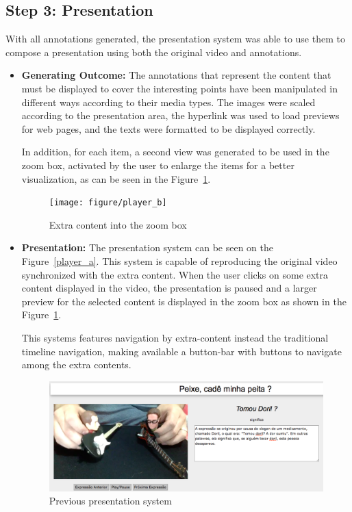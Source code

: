 \subsection{Step 3: Presentation}
With all annotations generated, the presentation system was able to use them to compose a presentation using both the original video and annotations.
	\begin{itemize}
		\item \textbf{Generating Outcome:} The annotations that represent the content that must be displayed to cover the interesting points have been manipulated in different ways according to their media types. The images were scaled according to the presentation area, the hyperlink was used to load previews for web pages, and the texts were formatted to be displayed correctly.
		
In addition, for each item, a second view was generated to be used in the zoom box, activated by the user to enlarge the items for a better visualization, as can be seen in the Figure~\ref{player_b}.
\begin{figure}[h]
	\centerline{\texttt{[image: figure/player\_b]}}
	\caption{Extra content into the zoom box}
	\label{player_b}
\end{figure}  		
	
		\item \textbf{Presentation:} The presentation system can be seen on the Figure~\ref{player_a}. This system is capable of reproducing the original video synchronized with the extra content. When the user clicks on some extra content displayed in the video, the presentation is paused and a larger preview for the selected content is displayed in the zoom box as shown in the Figure~\ref{player_b}. 
		
This systems features navigation by extra-content instead the traditional timeline navigation, making available
 a button-bar with buttons to navigate among the extra contents.
		
 		
\begin{figure}[h]
	\centerline{\includegraphics[scale=0.2] {figure/player_old}}
	\caption{Previous presentation system}
	\label{player_old}
\end{figure}  


\end{itemize}
